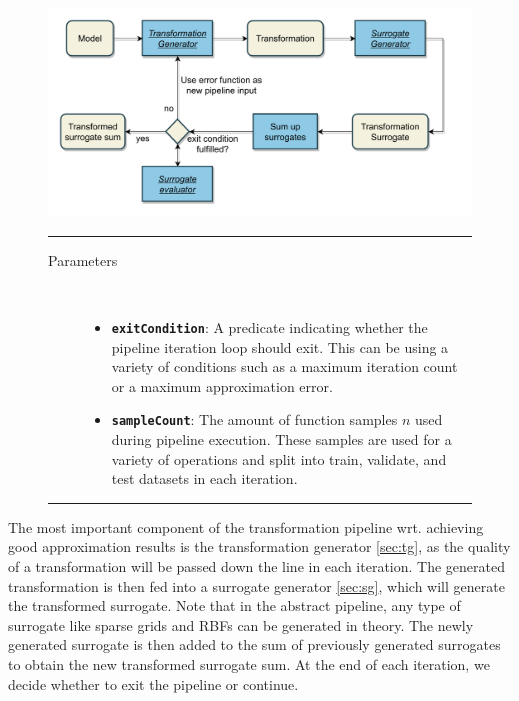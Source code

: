 \documentclass[
  a4paper,  %
  twoside,  %
  bibliography=totoc,
  headsepline,
  cleardoublepage=empty,
  parskip=half,
  draft=false
]{scrbook}
\newcommand{\delimit}{{\color{silver}\noindent\rule{\textwidth}{1pt}}}
\begin{document}
\begin{mdframed}[style=style,frametitle={Transformation Pipeline}]
\begin{figure}[H]

\includegraphics[width=\textwidth]{graphics/TransformationPipeline.pdf}
\vspace{-7.5mm}

\delimit

\begin{description}
\item[Parameters] {~ \begin{itemize}[\indent{}]
\item \texttt{\textbf{exitCondition}}: A predicate indicating whether the pipeline iteration loop should exit. This can be using a variety of conditions such as a maximum iteration count or a maximum approximation error.
\item \texttt{\textbf{sampleCount}}: The amount of function samples $n$ used during pipeline execution. These samples are used for a variety of operations and split into train, validate, and test datasets in each iteration.
\end{itemize}}
\end{description}

\delimit

\label{fig:tp}
\end{figure}
\end{mdframed}

The most important component of the transformation pipeline wrt. achieving good approximation results is the transformation generator \cref{sec:tg}, as the quality of a transformation will be passed down the line in each iteration.
The generated transformation is then fed into a surrogate generator \cref{sec:sg}, which will generate the transformed surrogate.
Note that in the abstract pipeline, any type of surrogate like sparse grids and RBFs can be generated in theory.
The newly generated surrogate is then added to the sum of previously generated surrogates to obtain the new transformed surrogate sum.
At the end of each iteration, we decide whether to exit the pipeline or continue.
\end{document}
